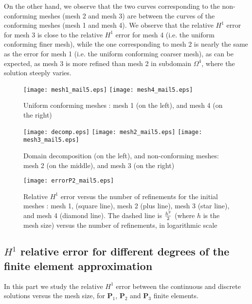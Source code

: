 \documentclass[final]{siamltex}
\begin{document}
On the other hand, we observe that the two
curves corresponding to the non-conforming meshes (mesh 2 and mesh 3)
are between the curves of the conforming meshes (mesh 1 and mesh
4). We observe that the relative $H^1$ error for mesh 3 is close to the relative $H^1$ error for mesh 4
(i.e. the uniform conforming finer mesh), while the one corresponding to mesh 2 is nearly the same as
the error for mesh 1 (i.e. the uniform conforming coarser mesh), as can be expected,
as mesh 3 is more refined than mesh 2 in subdomain $\Omega^4$, where the solution steeply varies.
\begin{figure}[H]
  \centering 
  \texttt{[image: mesh1\_mail5.eps]}
  \texttt{[image: mesh4\_mail5.eps]}
  \caption{Uniform conforming meshes : mesh 1 (on the left), and mesh 4 (on the right)}
  \label{fig:meshconf}
\end{figure}
\begin{figure}[H]
  \centering
  \hspace{-0.85cm}
   \texttt{[image: decomp.eps]}\hspace{-10.mm}
  \texttt{[image: mesh2\_mail5.eps]}\hspace{-10.0mm}
  \texttt{[image: mesh3\_mail5.eps]}
  \caption{Domain decomposition (on the left), and non-conforming meshes: mesh 2 (on the middle), and mesh 3
    (on the right)}
  \label{fig:meshnc}
\end{figure}
\begin{figure}[H]
  \centering 
  \texttt{[image: errorP2\_mail5.eps]}
  \caption{Relative $H^1$ error versus the number of refinements for
    the initial meshes : mesh 1, (square line), mesh 2 (plus line),
    mesh 3 (star line), and mesh 4 (diamond line). The dashed line is
    ${h^2 \over 2}$ (where $h$ is the mesh size) 
    versus the number of refinements, in logarithmic scale}
  \label{fig:errorestim}
\end{figure}
\subsection{$H^1$ relative error for different degrees of the finite element approximation}
\label{subsec:errP123}
In this part we study the relative $H^1$ error between the continuous and discrete solutions
versus the mesh size, for ${\mathbf{P}}_1$, ${\mathbf{P}}_2$ and ${\mathbf{P}}_3$ finite elements.
\end{document}
